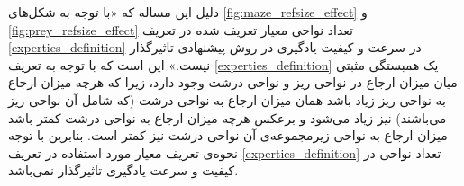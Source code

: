 دلیل این مساله که «با توجه به شکل‌های \ref{fig:maze_refsize_effect} و \ref{fig:prey_refsize_effect} تعداد نواحی معیار تعریف شده در تعریف \ref{experties_definition} در سرعت و کیفیت یادگیری در روش پیشنهادی تاثیرگذار نیست.» این است که با توجه به تعریف \ref{experties_definition} یک همبستگی مثبتی میان میزان ارجاع در نواحی ریز و نواحی درشت وجود دارد، زیرا که هرچه میزان ارجاع به نواحی ریز زیاد باشد همان میزان ارجاع به نواحی درشت (که شامل آن نواحی ریز می‌باشند) نیز زیاد می‌شود و برعکس هرچه میزان ارجاع به نواحی درشت کمتر باشد میزان ارجاع به نواحی زیرمجموعه‌ی آن نواحی درشت نیز کمتر است. بنابرین با توجه نحوه‌ی تعریف معیار مورد استفاده در تعریف \ref{experties_definition} تعداد نواحی در کیفیت و سرعت یادگیری تاثیرگذار نمی‌باشد.